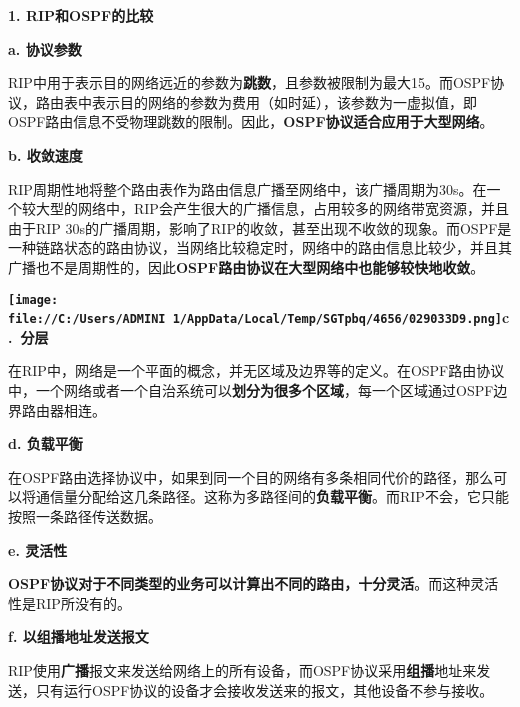 \textbf{{1. RIP和OSPF的比较}}

\textbf{{a. 协议参数}}

RIP中用于表示目的网络远近的参数为\textbf{跳数}，且参数被限制为最大15。而OSPF协议，路由表中表示目的网络的参数为费用（如时延），该参数为一虚拟值，即OSPF路由信息不受物理跳数的限制。因此，\textbf{OSPF协议适合应用于大型网络}。

\textbf{{b. 收敛速度}}

RIP周期性地将整个路由表作为路由信息广播至网络中，该广播周期为30s。在一个较大型的网络中，RIP会产生很大的广播信息，占用较多的网络带宽资源，并且由于RIP
30s的广播周期，影响了RIP的收敛，甚至出现不收敛的现象。而OSPF是一种链路状态的路由协议，当网络比较稳定时，网络中的路由信息比较少，并且其广播也不是周期性的，因此\textbf{OSPF路由协议在大型网络中也能够较快地收敛}。

\textbf{{\texttt{[image: file://C:/Users/ADMINI~1/AppData/Local/Temp/SGTpbq/4656/029033D9.png]}c.~分层}}

在RIP中，网络是一个平面的概念，并无区域及边界等的定义。在OSPF路由协议中，一个网络或者一个自治系统可以\textbf{划分为很多个区域}，每一个区域通过OSPF边界路由器相连。

\textbf{{d. 负载平衡}}

在OSPF路由选择协议中，如果到同一个目的网络有多条相同代价的路径，那么可以将通信量分配给这几条路径。这称为多路径间的\textbf{负载平衡}。而RIP不会，它只能按照一条路径传送数据。

\textbf{{e. 灵活性}}

\textbf{OSPF协议对于不同类型的业务可以计算出不同的路由，十分灵活}。而这种灵活性是RIP所没有的。

\textbf{{f. 以组播地址发送报文}}

RIP使用{\textbf{广播}}报文来发送给网络上的所有设备，而OSPF协议采用{\textbf{组播}}地址来发送，只有运行OSPF协议的设备才会接收发送来的报文，其他设备不参与接收。
